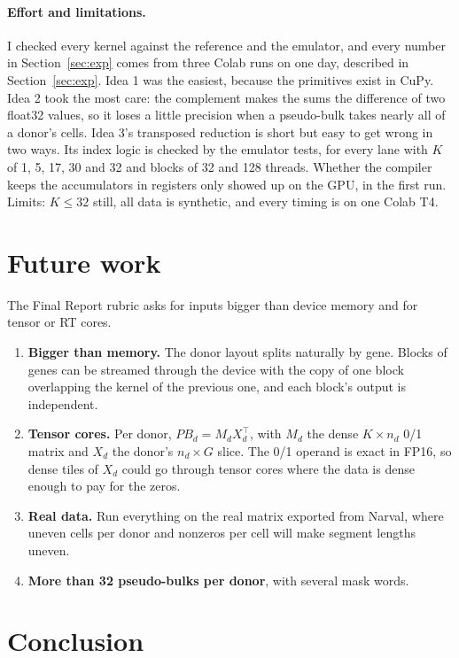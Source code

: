 \documentclass[sigconf,nonacm]{acmart}
\begin{document}
\paragraph{Effort and limitations.}
I checked every kernel against the reference and the emulator, and every number in Section~\ref{sec:exp} comes from three Colab runs on one day, described in Section~\ref{sec:exp}. Idea 1 was the easiest, because the primitives exist in
CuPy. Idea 2 took the most care: the complement makes the sums the difference of two float32 values, so
it loses a little precision when a pseudo-bulk takes nearly all of a donor's cells. Idea 3's
transposed reduction is short but easy to get wrong in two ways. Its index logic is checked by the
emulator tests, for every lane with $K$ of 1, 5, 17, 30 and 32 and blocks of 32 and 128 threads. Whether
the compiler keeps the accumulators in registers only showed up on the GPU, in the first run.
Limits: $K \le 32$ still, all data is synthetic, and every timing is on one Colab T4.



\section{Future work}

The Final Report rubric asks for inputs bigger than device memory and for tensor or RT cores.
\begin{enumerate}
\item \textbf{Bigger than memory.} The donor layout splits naturally by gene. Blocks of genes can be
streamed through the device with the copy of one block overlapping the kernel of the previous one, and
each block's output is independent.
\item \textbf{Tensor cores.} Per donor, $PB_d = M_d X_d^{\top}$, with $M_d$ the dense $K \times n_d$
0/1 matrix and $X_d$ the donor's $n_d \times G$ slice. The 0/1 operand is exact in FP16, so dense
tiles of $X_d$ could go through tensor cores where the data is dense enough to pay for the zeros.
\item \textbf{Real data.} Run everything on the real matrix exported from Narval, where uneven cells
per donor and nonzeros per cell will make segment lengths uneven.
\item \textbf{More than 32 pseudo-bulks per donor}, with several mask words.
\end{enumerate}

\section{Conclusion}
\end{document}
